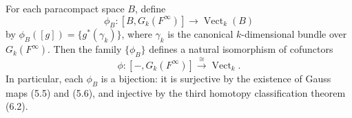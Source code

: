 For each paracompact space $B$, define
$$
\phi_B: [B, G_k(F^\infty)] \to \operatorname{Vect}_k(B)
$$
by $\phi_B([g]) = \{g^*(\gamma_k)\}$, where $\gamma_k$ is the canonical $k$-dimensional bundle over $G_k(F^\infty)$. Then the family $\{\phi_B\}$ defines a natural isomorphism of cofunctors
$$
\phi: [-, G_k(F^\infty)] \xrightarrow{\cong} \operatorname{Vect}_k.
$$
In particular, each $\phi_B$ is a bijection: it is surjective by the existence of Gauss maps (5.5) and (5.6), and injective by the third homotopy classification theorem (6.2).
